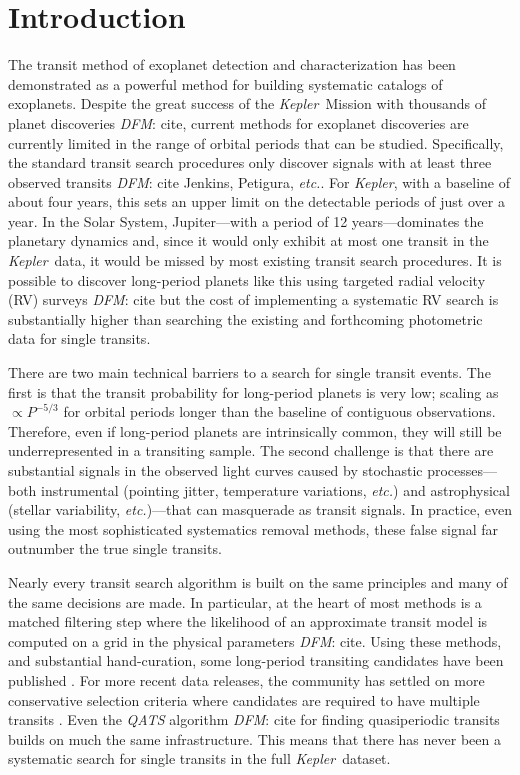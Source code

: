 \documentclass[12pt,preprint]{aastex}
\newcommand{\project}[1]{\textsl{#1}}
\newcommand{\kepler}{\project{Kepler}}
\newcommand{\foreign}[1]{\emph{#1}}
\newcommand{\etc}{\foreign{etc.}}
\newcommand{\todo}[3]{{\color{#2}\emph{#1}: #3}}
\newcommand{\dfmtodo}[1]{\todo{DFM}{red}{#1}}
\newcommand{\period}{{\ensuremath{P}}}
\begin{document}

\section{Introduction}

The transit method of exoplanet detection and characterization has been
demonstrated as a powerful method for building systematic catalogs of
exoplanets.
Despite the great success of the \kepler\ Mission with thousands of planet
discoveries \dfmtodo{cite}, current methods for exoplanet discoveries are
currently limited in the range of orbital periods that can be studied.
Specifically, the standard transit search procedures only discover signals
with at least three observed transits \dfmtodo{cite Jenkins, Petigura, \etc}.
For \kepler, with a baseline of about four years, this sets an upper limit on
the detectable periods of just over a year.
In the Solar System, Jupiter---with a period of 12 years---dominates the
planetary dynamics and, since it would only exhibit at most one transit in the
\kepler\ data, it would be missed by most existing transit search procedures.
It is possible to discover long-period planets like this using targeted radial
velocity (RV) surveys \dfmtodo{cite} but the cost of implementing a systematic
RV search is substantially higher than searching the existing and forthcoming
photometric data for single transits.

There are two main technical barriers to a search for single transit events.
The first is that the transit probability for long-period planets is very low;
scaling as $\propto\period^{-5/3}$ for orbital periods longer than the
baseline of contiguous observations.
Therefore, even if long-period planets are intrinsically common, they will
still be underrepresented in a transiting sample.
The second challenge is that there are substantial signals in the observed
light curves caused by stochastic processes---both instrumental
(pointing jitter, temperature variations, \etc) and astrophysical (stellar
variability, \etc)---that can masquerade as transit signals.
In practice, even using the most sophisticated systematics removal methods,
these false signal far outnumber the true single transits.

Nearly every transit search algorithm is built on the same principles and many
of the same decisions are made.
In particular, at the heart of most methods is a matched filtering step where
the likelihood of an approximate transit model is computed on a grid in the
physical parameters \dfmtodo{cite}.
Using these methods, and substantial hand-curation, some long-period
transiting candidates have been published \citep[for example][]{Batalha:2013,
Huang:2013, Kipping:2014a}.
For more recent data releases, the community has settled on more conservative
selection criteria where candidates are required to have multiple transits
\citep[for example][]{Petigura:2013, Burke:2014}.
Even the \project{QATS} algorithm \dfmtodo{cite} for finding quasiperiodic
transits builds on much the same infrastructure.
This means that there has never been a systematic search for single transits
in the full \kepler\ dataset.
\end{document}
